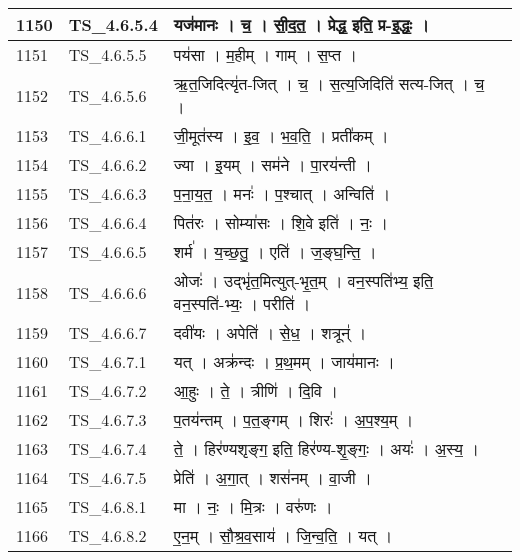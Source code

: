 \documentclass[17pt]{extarticle}
\begin{document}
\begin{longtable}{||p{0.4in}||p{0.9in}||p{4.0in}||p{0.9in}||}
        \hline
            1150 & TS\_4.6.5.4 & यज॑मानः   ।   च॒   ।   सी॒द॒त॒   ।   प्रेद्ध॒ इति॒ प्र{-}इ॒द्धः॒   ।    &      \\
        \hline
            1151 & TS\_4.6.5.5 & पय॑सा   ।   म॒हीम्   ।   गाम्   ।   स॒प्त   ।    &      \\
        \hline
            1152 & TS\_4.6.5.6 & ऋ॒त॒जिदित्यृ॑त{-}जित्   ।   च॒   ।   स॒त्य॒जिदिति॑ सत्य{-}जित्   ।   च॒   ।    &      \\
        \hline
            1153 & TS\_4.6.6.1 & जी॒मूत॑स्य   ।   इ॒व॒   ।   भ॒व॒ति॒   ।   प्रती॑कम्   ।    &      \\
        \hline
            1154 & TS\_4.6.6.2 & ज्या   ।   इ॒यम्   ।   सम॑ने   ।   पा॒रय॑न्ती   ।    &      \\
        \hline
            1155 & TS\_4.6.6.3 & प॒ना॒य॒त॒   ।   मनः॑   ।   प॒श्चात्   ।   अन्विति॑   ।    &      \\
        \hline
            1156 & TS\_4.6.6.4 & पित॑रः   ।   सोम्या॑सः   ।   शि॒वे इति॑   ।   नः॒   ।    &      \\
        \hline
            1157 & TS\_4.6.6.5 & शर्म॑   ।   य॒च्छ॒तु॒   ।   एति॑   ।   ज॒ङ्घ॒न्ति॒   ।    &      \\
        \hline
            1158 & TS\_4.6.6.6 & ओजः॑   ।   उद्भृ॑त॒मित्युत्{-}भृ॒त॒म्   ।   वन॒स्पति॑भ्य॒ इति॒ वन॒स्पति॑{-}भ्यः॒   ।   परीति॑   ।    &      \\
        \hline
            1159 & TS\_4.6.6.7 & दवी॑यः   ।   अपेति॑   ।   से॒ध॒   ।   शत्रून्॑   ।    &      \\
        \hline
            1160 & TS\_4.6.7.1 & यत्   ।   अक्र॑न्दः   ।   प्र॒थ॒मम्   ।   जाय॑मानः   ।    &      \\
        \hline
            1161 & TS\_4.6.7.2 & आ॒हुः   ।   ते॒   ।   त्रीणि॑   ।   दि॒वि   ।    &      \\
        \hline
            1162 & TS\_4.6.7.3 & प॒तय॑न्तम्   ।   प॒त॒ङ्गम्   ।   शिरः॑   ।   अ॒प॒श्य॒म्   ।    &      \\
        \hline
            1163 & TS\_4.6.7.4 & ते॒   ।   हिर॑ण्यशृङ्ग॒ इति॒ हिर॑ण्य{-}शृ॒ङ्गः॒   ।   अयः॑   ।   अ॒स्य॒   ।    &      \\
        \hline
            1164 & TS\_4.6.7.5 & प्रेति॑   ।   अ॒गा॒त्   ।   शस॑नम्   ।   वा॒जी   ।    &      \\
        \hline
            1165 & TS\_4.6.8.1 & मा   ।   नः॒   ।   मि॒त्रः   ।   वरु॑णः   ।    &      \\
        \hline
            1166 & TS\_4.6.8.2 & ए॒न॒म्   ।   सौ॒श्र॒व॒साय॑   ।   जि॒न्व॒ति॒   ।   यत्   ।    &      \\

\end{longtable}
\end{document}
